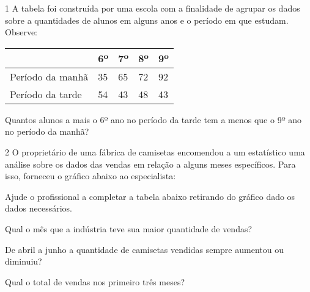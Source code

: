 
\num{1} A tabela foi construída por uma escola com a finalidade de agrupar
os dados sobre a quantidades de alunos em alguns anos e o período em que
estudam. Observe:

\begin{longtable}[]{@{}lllll@{}}
\toprule
& 6º & 7º & 8º & 9º\tabularnewline
\midrule
\endhead
Período da manhã & 35 & 65 & 72 & 92\tabularnewline
Período da tarde & 54 & 43 & 48 & 43\tabularnewline
\bottomrule
\end{longtable}

Quantos alunos a mais o 6º ano no período da tarde tem a menos que o 9º
ano no período da manhã?



\num{2} O proprietário de uma fábrica de camisetas encomendou a um
estatístico uma análise sobre os dados das vendas em relação a alguns
meses específicos. Para isso, forneceu o gráfico abaixo ao especialista:


\begin{escolha}
\item
  Ajude o profissional a completar a tabela abaixo retirando do gráfico
  dado os dados necessários.


\item
  Qual o mês que a indústria teve sua maior quantidade de vendas?


\item
  De abril a junho a quantidade de camisetas vendidas sempre aumentou ou
  diminuiu?


\item
  Qual o total de vendas nos primeiro três meses?

\end{escolha}



